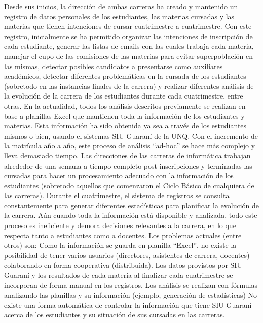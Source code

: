Desde sus inicios, la dirección de ambas carreras ha creado y mantenido un registro de datos personales de los estudiantes, las materias cursadas y las materias que tienen intenciones de cursar cuatrimestre a cuatrimestre. Con este registro, inicialmente se ha permitido organizar las intenciones de inscripción de cada estudiante, generar las listas de emails con las cuales trabaja cada materia, manejar el cupo de las comisiones de las materias para evitar superpoblación en las mismas, detectar posibles candidatos a presentarse como auxiliares académicos, detectar diferentes problemáticas en la cursada de los estudiantes (sobretodo en las instancias finales de la carrera) y realizar diferentes análisis de la evolución de la carrera de los estudiantes durante cada cuatrimestre, entre otras.
En la actualidad, todos los análisis descritos previamente se realizan en base a planillas Excel que mantienen toda la información de los estudiantes y materias. Esta información ha sido obtenida ya sea a través de los estudiantes mismos o bien, usando el sistemas SIU-Guaraní de la UNQ.
Con el incremento de la matrícula año a año, este proceso de análisis “ad-hoc” se hace más complejo y lleva demasiado tiempo. Las direcciones de las carreras de informática trabajan alrededor de una semana a tiempo completo post inscripciones y terminadas las cursadas para hacer un procesamiento adecuado con  la información de los estudiantes (sobretodo aquellos que comenzaron el Ciclo Básico de cualquiera de las carreras). Durante el cuatrimestre, el sistema de registros se consulta constantemente para generar diferentes estadísticas para planificar la evolución de la carrera. Aún cuando toda la información está disponible y analizada, todo este proceso es ineficiente y demora decisiones relevantes a la carrera, en lo que respecta tanto a estudiantes como a docentes. Los problemas actuales (entre otros) son:
Como la información se guarda en planilla “Excel”, no existe la posibilidad de tener varios usuarios (directores, asistentes de carrera, docentes) colaborando en forma cooperativa (distribuida).
Los datos provistos por SIU-Guaraní y los resultados de cada materia al finalizar cada cuatrimestre se incorporan de forma manual en los registros.
Los análisis se realizan con fórmulas analizando las planillas y su información (ejemplo, generación de estadísticas)
No existe una forma automática de controlar la información que tiene SIU-Guaraní acerca de los estudiantes y su situación de sus cursadas en las carreras.

